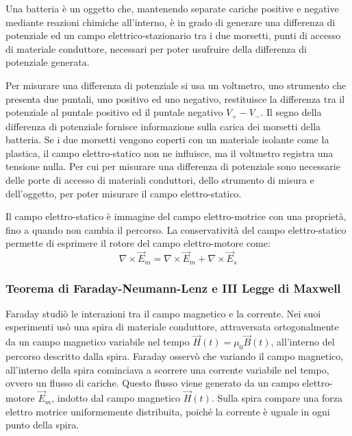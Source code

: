 \documentclass{article}
\numberwithin{equation}{subsection}
\begin{document}
Una batteria è un oggetto che, mantenendo separate cariche positive e negative mediante reazioni chimiche all'interno, è in grado di generare una differenza di potenziale 
ed un campo elettrico-stazionario tra i due morsetti, punti di accesso di materiale conduttore, necessari per poter usufruire della differenza di potenziale generata. 

Per misurare una differenza di potenziale si usa un voltmetro, uno strumento che presenta due puntali, uno positivo ed uno negativo, restituisce la differenza tra il potenziale 
al puntale positivo ed il puntale negativo $V_+-V_-$. Il segno della differenza di potenziale fornisce informazione sulla carica dei morsetti della batteria. Se i due morsetti 
vengono coperti con un materiale isolante come la plastica, il campo elettro-statico non ne influisce, ma il voltmetro registra una tensione nulla. Per cui per misurare una 
differenza di potenziale sono necessarie delle porte di accesso di materiali conduttori, dello strumento di misura e dell'oggetto, per poter misurare il campo elettro-statico. 


Il campo elettro-statico è immagine del campo elettro-motrice con una proprietà, fino a quando non cambia il percorso. La conservatività del campo elettro-statico permette 
di esprimere il rotore del campo elettro-motore come:
\begin{equation*}
    \nabla\times\vec{E}_m=\nabla\times\vec{E}_m+\nabla\times\vec{E}_s
\end{equation*}

\subsubsection{Teorema di Faraday-Neumann-Lenz e III Legge di Maxwell}

Faraday studiò le interazioni tra il campo magnetico e la corrente. Nei suoi esperimenti usò una spira di materiale conduttore, attraversata ortogonalmente da un campo magnetico 
variabile nel tempo $\vec{H}(t)=\mu_0\vec{B}(t)$, all'interno del percorso descritto dalla spira. Faraday osservò che variando il campo magnetico, all'interno della spira 
cominciava a scorrere una corrente variabile nel tempo, ovvero un flusso di cariche. Questo flusso viene generato da un campo elettro-motore $\vec{E}_m$, indotto dal campo 
magnetico $\vec{H}(t)$. Sulla spira compare una forza elettro motrice uniformemente distribuita, poiché la corrente è uguale in ogni punto della spira. 
\end{document}
